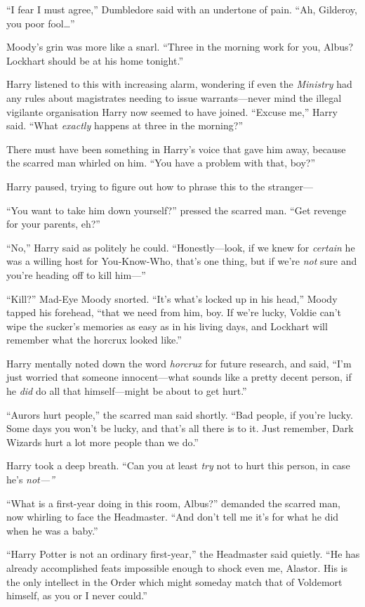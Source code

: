 ``I fear I must agree,'' Dumbledore said with an undertone of pain.
``Ah, Gilderoy, you poor fool\ldots{}''

Moody's grin was more like a snarl. ``Three in the morning work for you,
Albus? Lockhart should be at his home tonight.''

Harry listened to this with increasing alarm, wondering if even the
\emph{Ministry} had any rules about magistrates needing to issue
warrants---never mind the illegal vigilante organisation Harry now
seemed to have joined. ``Excuse me,'' Harry said. ``What \emph{exactly}
happens at three in the morning?''

There must have been something in Harry's voice that gave him away,
because the scarred man whirled on him. ``You have a problem with that,
boy?''

Harry paused, trying to figure out how to phrase this to the stranger---

``You want to take him down yourself?'' pressed the scarred man. ``Get
revenge for your parents, eh?''

``No,'' Harry said as politely he could. ``Honestly---look, if we knew
for \emph{certain} he was a willing host for You-Know-Who, that's one
thing, but if we're \emph{not} sure and you're heading off to kill
him---''

``Kill?'' Mad-Eye Moody snorted. ``It's what's locked up in his head,''
Moody tapped his forehead, ``that we need from him, boy. If we're lucky,
Voldie can't wipe the sucker's memories as easy as in his living days,
and Lockhart will remember what the horcrux looked like.''

Harry mentally noted down the word \emph{horcrux} for future research,
and said, ``I'm just worried that someone innocent---what sounds like a
pretty decent person, if he \emph{did} do all that himself---might be
about to get hurt.''

``Aurors hurt people,'' the scarred man said shortly. ``Bad people, if
you're lucky. Some days you won't be lucky, and that's all there is to
it. Just remember, Dark Wizards hurt a lot more people than we do.''

Harry took a deep breath. ``Can you at least \emph{try} not to hurt this
person, in case he's \emph{not---''}

``What is a first-year doing in this room, Albus?'' demanded the scarred
man, now whirling to face the Headmaster. ``And don't tell me it's for
what he did when he was a baby.''

``Harry Potter is not an ordinary first-year,'' the Headmaster said
quietly. ``He has already accomplished feats impossible enough to shock
even me, Alastor. His is the only intellect in the Order which might
someday match that of Voldemort himself, as you or I never could.''

